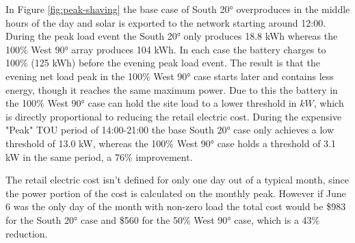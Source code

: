 \documentclass[
]{article}
\begin{document}
In Figure \ref{fig:peak-shaving} the base case of South 20° overproduces in the middle hours
of the day and solar is exported to the network starting around 12:00.
During the peak load event the South 20° only produces 18.8 kWh whereas
the 100\% West 90° array produces 104 kWh. In each case the battery
charges to 100\% (125 kWh) before the evening peak load event. The
result is that the evening net load peak in the 100\% West 90° case
starts later and contains less energy, though it reaches the same
maximum power. Due to this the battery in the 100\% West 90° case can
hold the site load to a lower threshold in \(kW\), which is directly
proportional to reducing the retail electric cost. During the expensive
"Peak" TOU period of 14:00-21:00 the base South 20° case only achieves a
low threshold of 13.0 kW, whereas the 100\% West 90° case holds a
threshold of 3.1 kW in the same period, a 76\% improvement.

The retail electric cost isn't defined for only one day out of a typical
month, since the power portion of the cost is calculated on the monthly
peak. However if June 6 was the only day of the month with non-zero load
the total cost would be \$983 for the South 20° case and \$560 for the
50\% West 90° case, which is a 43\% reduction.
\end{document}

